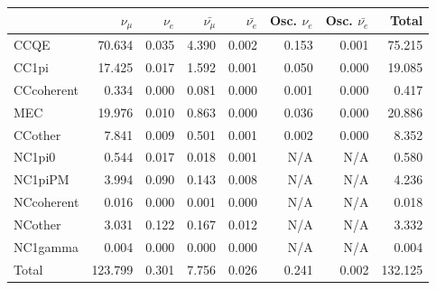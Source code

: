
\begin{table}
\center
\begin{tabular} { | l ||r | r | r | r | r | r | | r | }
\hline
 
              & $\nu_\mu$            & $\nu_e$              & $\bar{\nu_\mu}$      & $\bar{\nu_e}$        & Osc. $\nu_e$         & Osc. $\bar{\nu_e}$   & Total                \\ \hline\hline
 CCQE         & 70.634               & 0.035                & 4.390                & 0.002                & 0.153                & 0.001                & 75.215               \\ \hline
 CC1pi        & 17.425               & 0.017                & 1.592                & 0.001                & 0.050                & 0.000                & 19.085               \\ \hline
 CCcoherent   & 0.334                & 0.000                & 0.081                & 0.000                & 0.001                & 0.000                & 0.417                \\ \hline
 MEC          & 19.976               & 0.010                & 0.863                & 0.000                & 0.036                & 0.000                & 20.886               \\ \hline
 CCother      & 7.841                & 0.009                & 0.501                & 0.001                & 0.002                & 0.000                & 8.352                \\ \hline
 NC1pi0       & 0.544                & 0.017                & 0.018                & 0.001                & N/A                  & N/A                  & 0.580                \\ \hline
 NC1piPM      & 3.994                & 0.090                & 0.143                & 0.008                & N/A                  & N/A                  & 4.236                \\ \hline
 NCcoherent   & 0.016                & 0.000                & 0.001                & 0.000                & N/A                  & N/A                  & 0.018                \\ \hline
 NCother      & 3.031                & 0.122                & 0.167                & 0.012                & N/A                  & N/A                  & 3.332                \\ \hline
 NC1gamma     & 0.004                & 0.000                & 0.000                & 0.000                & N/A                  & N/A                  & 0.004                \\ \hline
\hline
 Total        & 123.799              & 0.301                & 7.756                & 0.026                & 0.241                & 0.002                & 132.125              \\ \hline


\end{tabular}
\end{table}
